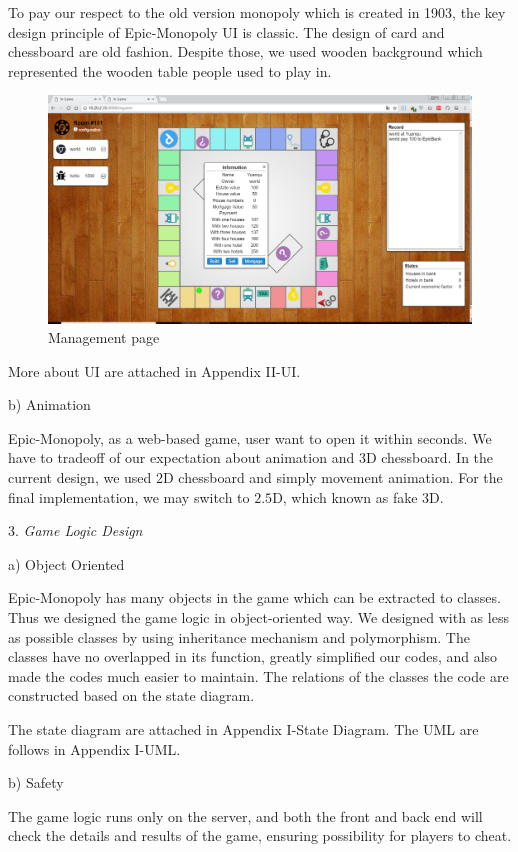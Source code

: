 \documentclass[a4paper,11pt]{article}
\begin{document}
To pay our respect to the old version monopoly which is created in 1903, the key design principle of Epic-Monopoly UI is classic. The design of card and chessboard are old fashion. Despite those, we used wooden background which represented the wooden table people used to play in. 
\begin{figure}
\includegraphics[scale=0.32]{image/ingame2.png}
\caption{Management page}
\end{figure}

More about UI are attached in Appendix II-UI.

b)	Animation

Epic-Monopoly, as a web-based game, user want to open it within seconds. We have to tradeoff of our expectation about animation and $3$D chessboard. In the current design, we used $2$D chessboard and simply movement animation. For the final implementation, we may switch to $2.5$D, which known as fake $3$D.

3.	\emph{Game Logic Design}

a)	Object Oriented

Epic-Monopoly has many objects in the game which can be extracted to classes. Thus we designed the game logic in object-oriented way. We designed with as less as possible classes by using inheritance mechanism and polymorphism. The classes have no overlapped in its function, greatly simplified our codes, and also made the codes much easier to maintain. The relations of the classes the code are constructed based on the state diagram. 

The state diagram are attached in Appendix I-State Diagram.
The UML are follows in Appendix I-UML.

b)	Safety

The game logic runs only on the server, and both the front and back end will check the details and results of the game, ensuring possibility for players to cheat.
\end{document}
